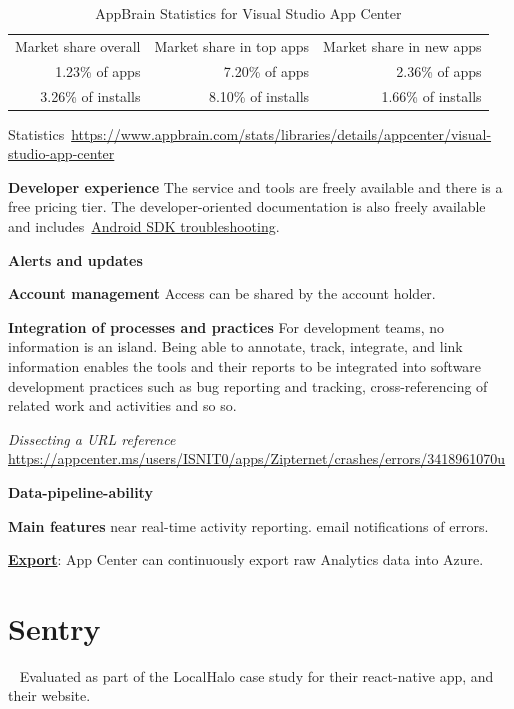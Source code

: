 \begin{table}[htbp!]
    \centering
    \footnotesize
    \begin{tabular}{rrr}
      Market share overall  &Market share in top apps &Market share in new apps  \\
      1.23\% of apps	  &7.20\% of apps &2.36\% of apps\\
      3.26\% of installs &8.10\% of installs &1.66\% of installs \\
    \end{tabular}
    \caption{AppBrain Statistics for Visual Studio App Center}
    \label{tab:appbrain_statistics_appcenter}
\end{table}

	

Statistics~\url{https://www.appbrain.com/stats/libraries/details/appcenter/visual-studio-app-center}

\textbf{Developer experience} The service and tools are freely available and there is a free pricing tier. The developer-oriented documentation is also freely available and includes~\href{https://docs.microsoft.com/en-us/appcenter/sdk/troubleshooting/android}{Android SDK troubleshooting}.

\textbf{Alerts and updates} 

\textbf{Account management} Access can be shared by the account holder.

\textbf{Integration of processes and practices} For development teams, no information is an island. Being able to annotate, track, integrate, and link information enables the tools and their reports to be integrated into software development practices such as bug reporting and tracking, cross-referencing of related work and activities and so so.

\emph{Dissecting a URL reference}
\url{https://appcenter.ms/users/ISNIT0/apps/Zipternet/crashes/errors/3418961070u}


\textbf{Data-pipeline-ability}


\textbf{Main features}
near real-time activity reporting.
email notifications of errors.

\href{https://docs.microsoft.com/en-us/appcenter/analytics/export}{\textbf{Export}}: App Center can continuously export raw Analytics data into Azure.

\section{Sentry}~\label{analytics-tools-sentry}
Evaluated as part of the LocalHalo case study for their react-native app, and their website.

